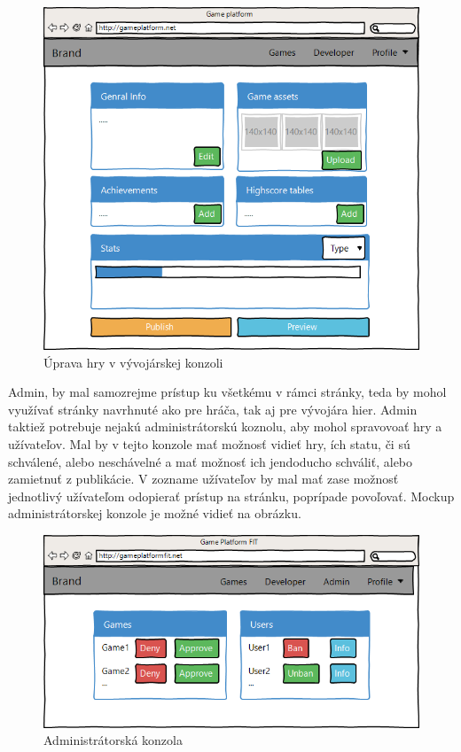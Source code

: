 \begin{figure}[h]
  \centering
  \includegraphics[scale=0.6]{fig/gui-detail-vyvojar.png}
  \caption{Úprava hry v vývojárskej konzoli}
  \label{fig:guidetailvyvojar}
\end{figure}
Admin, by mal samozrejme prístup ku všetkému v rámci stránky, teda by mohol využívať stránky navrhnuté ako pre hráča, tak aj pre vývojára hier. Admin taktiež potrebuje nejakú administrátorskú koznolu, aby mohol spravovoať hry a užívateľov. Mal by v tejto konzole mať možnosť vidieť hry, ích statu, či sú schválené, alebo neschávelné a mať možnosť ich jendoducho schváliť, alebo zamietnuť z publikácie. V zozname užívateľov by mal mať zase možnosť jednotlivý užívateľom odopierať prístup na stránku, poprípade povoľovať. Mockup administrátorskej konzole je možné vidieť na obrázku.
\begin{figure}[h]
  \centering
  \includegraphics[scale=0.6]{fig/gui-admin.png}
  \caption{Administrátorská konzola}
  \label{fig:guiadmin}
\end{figure}

